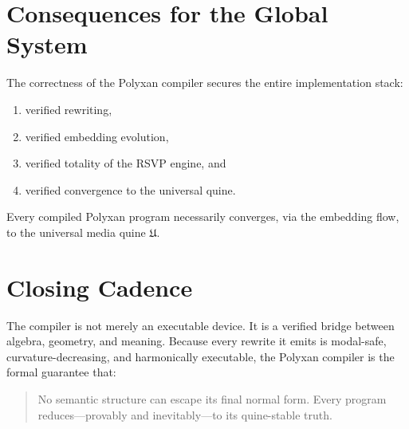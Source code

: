 \section{Consequences for the Global System}

The correctness of the Polyxan compiler secures the entire implementation stack:

\begin{enumerate}
\item verified rewriting,
\item verified embedding evolution,
\item verified totality of the RSVP engine, and
\item verified convergence to the universal quine.
\end{enumerate}

\begin{corollary}
Every compiled Polyxan program necessarily converges, via the embedding flow, to the universal media quine $\mathfrak{U}$.
\end{corollary}

\section{Closing Cadence}

The compiler is not merely an executable device.
It is a verified bridge between algebra, geometry, and meaning.
Because every rewrite it emits is modal-safe, curvature-decreasing, and harmonically executable, the Polyxan compiler is the formal guarantee that:

\begin{quote}
No semantic structure can escape its final normal form.
Every program reduces---provably and inevitably---to its quine-stable truth.
\end{quote}


